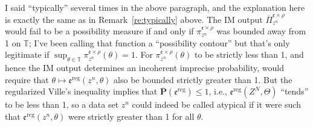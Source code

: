\documentclass[a4paper, 12pt]{article}
\theoremstyle{plain}
\theoremstyle{definition}
\theoremstyle{remark}
\newcommand{\TT}{\mathbb{T}}
\newcommand{\uPi}{\overline{\Pi}}
\newcommand{\uuprob}{\mathbf{\overline{P}}}
\newcommand{\eval}{\mathfrak{e}}
\begin{document}
I said ``typically'' several times in the above paragraph, and the explanation here is exactly the same as in Remark~\ref{re:typically} above.  The IM output $\uPi_{z^n}^{\eval \times \rho}$ would fail to be a possibility measure if and only if $\pi_{z^n}^{\eval \times \rho}$ was bounded away from 1 on $\TT$; I've been calling that function a ``possibility contour'' but that's only legitimate if $\sup_{\theta \in \TT} \pi_{z^n}^{\eval \times \rho}(\theta) = 1$.  For $\pi_{z^n}^{\eval \times \rho}(\theta)$ to be strictly less than 1, and hence the IM output determines an incoherent imprecise probability, would require that $\theta \mapsto \eval^\text{reg}(z^n, \theta)$ also be bounded strictly greater than 1.  But the regularized Ville's inequality implies that $\uuprob(\eval^\text{reg}) \leq 1$, i.e., $\eval^\text{reg}(Z^N,\Theta)$ ``tends'' to be less than 1, so a data set $z^n$ could indeed be called atypical if it were such that $\eval^\text{reg}(z^n, \theta)$ were strictly greater than 1 for all $\theta$.  
\end{document}
